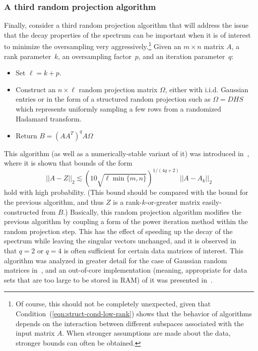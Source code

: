 \documentclass[twoside]{article}
\begin{document}
\subsubsection{A third random projection algorithm}
\label{sxn:low-rank:proj-third}

Finally, consider a third random projection algorithm that will address the 
issue that the decay properties of the spectrum can be important when it is 
of interest to minimize the oversampling very aggressively.\footnote{Of course, this should not be completely unexpected, given that 
Condition~(\ref{eqn:struct-cond-low-rank}) shows that the behavior of 
algorithms depends on the interaction between different subspaces 
associated with the input matrix $A$.  When stronger assumptions are made
about the data, stronger bounds can often be obtained.} 
Given an $m \times n$ matrix $A$, a rank parameter~$k$, an oversampling
factor~$p$, and an iteration parameter~$q$:
\begin{itemize}
\item
Set $\ell = k + p$.
\item
Construct an $n \times \ell$ random projection matrix $\Omega$, either with 
i.i.d.  Gaussian entries or in the form of a structured random projection 
such as $\Omega = DHS$ which represents uniformly sampling a few rows from 
a randomized Hadamard transform.
\item
Return $B = (AA^T)^{q} A \Omega$
\end{itemize}
This algorithm (as well as a numerically-stable variant of it) was 
introduced in~\cite{RST09}, where it is shown that bounds of the form
$$
||A-Z||_2 \lesssim \left(10 \sqrt{\ell \min\{m,n\}} \right)^{1/(4q+2)} ||A-A_k||_2
$$
hold with high probability.
(This bound should be compared with the bound for the previous algorithm, and 
thus $Z$ is a rank-$k$-or-greater matrix easily-constructed from $B$.)
Basically, this random projection algorithm modifies the previous algorithm 
by coupling a form of the power iteration method within the random 
projection step.
This has the effect of speeding up the decay of the spectrum while leaving 
the singular vectors unchanged, and it is observed in~\cite{RST09,HMT09_SIREV} 
that $q=2$ or $q=4$ is often sufficient for certain data matrices of 
interest.
This algorithm was analyzed in greater detail for the case of Gaussian 
random matrices in~\cite{HMT09_SIREV}, and an out-of-core implementation (meaning, 
appropriate for data sets that are too large to be stored in RAM) of it was 
presented in~\cite{HMST10_TR}.
\end{document}
